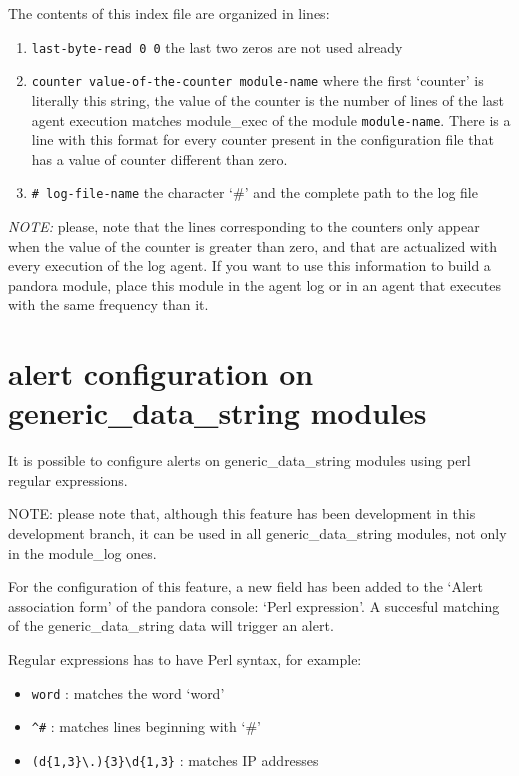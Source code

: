 \documentclass[a4paper,10pt]{article}
\begin{document}
The contents of this index file are organized in lines:

\begin{enumerate}
\item \verb|last-byte-read 0 0|    the last two zeros are not used already
\item \verb|counter value-of-the-counter module-name|   where the first `counter' is literally this string, the value of the counter is the number of lines of the last agent execution matches module\_exec of the module \verb|module-name|.  There is a line with this format for every counter present in the configuration file that has a value of counter different than zero.
\item \verb|# log-file-name|   the character `\#' and the complete path to the log file
\end{enumerate}

\emph{NOTE:}   please, note that the lines corresponding to the counters only appear when the value of the counter is greater than zero, and that are actualized with every execution of the log agent. If you want to use this information to build a pandora module, place this module in the agent log or in an agent that executes with the same frequency than it.



\section{alert configuration on generic\_data\_string modules}\label{sec:alerts}
  
  It is possible to configure alerts on
  generic\_data\_string modules using perl regular expressions.
  
  
  NOTE:  please note that, although this feature has been development in this
  development branch, it can be used in all generic\_data\_string modules, not
  only in the module\_log ones.
  
  
  For the configuration of this feature, a new field has been added to the 
  `Alert association form' of the pandora console: `Perl expression'. A 
  succesful matching of the generic\_data\_string data will trigger an alert.
  
  
  Regular expressions has to have Perl syntax, for example:
  
\begin{itemize}
    
\item      \verb|word| : matches the word `word'
    
    
\item      \verb|^#| : matches lines beginning with `\#'

    
\item      \verb|(d{1,3}\.){3}\d{1,3}| :  matches IP addresses
    
\end{itemize}
\end{document}
